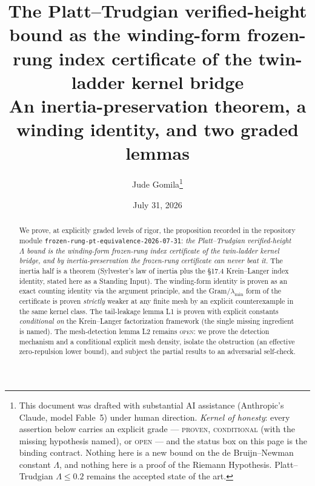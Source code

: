 \documentclass[11pt]{article}
\title{The Platt--Trudgian verified-height bound as the winding-form
frozen-rung index certificate of the twin-ladder kernel bridge\\[1ex]
\large An inertia-preservation theorem, a winding identity, and two graded lemmas}
\author{Jude Gomila\thanks{This document was drafted with substantial AI
assistance (Anthropic's Claude, model Fable~5) under human direction.
\emph{Kernel of honesty}: every assertion below carries an explicit grade ---
\textsc{proven}, \textsc{conditional} (with the missing hypothesis named), or
\textsc{open} --- and the status box on this page is the binding contract.
Nothing here is a new bound on the de Bruijn--Newman constant $\Lambda$, and
nothing here is a proof of the Riemann Hypothesis. Platt--Trudgian
$\Lambda\le 0.2$ remains the accepted state of the art.}}
\date{July 31, 2026}
\theoremstyle{definition}
\theoremstyle{remark}
\begin{document}
\maketitle

\begin{abstract}
\noindent We prove, at explicitly graded levels of rigor, the proposition
recorded in the repository module
\texttt{frozen-rung-pt-equivalence-2026-07-31}: \emph{the Platt--Trudgian
verified-height $\Lambda$ bound is the winding-form frozen-rung index
certificate of the twin-ladder kernel bridge, and by inertia-preservation the
frozen-rung certificate can never beat it.} The inertia half is a theorem
(Sylvester's law of inertia plus the \S17.4 Krein--Langer index identity,
stated here as a Standing Input). The winding-form identity is proven as an
exact counting identity via the argument principle, and the Gram/$\lambda_{\min}$
form of the certificate is proven \emph{strictly} weaker at any finite mesh by
an explicit counterexample in the same kernel class. The tail-leakage lemma L1
is proven with explicit constants \emph{conditional on} the Krein--Langer
factorization framework (the single missing ingredient is named). The
mesh-detection lemma L2 remains \textsc{open}: we prove the detection
mechanism and a conditional explicit mesh density, isolate the obstruction (an
effective zero-repulsion lower bound), and subject the partial results to an
adversarial self-check.
\end{abstract}
\end{document}
